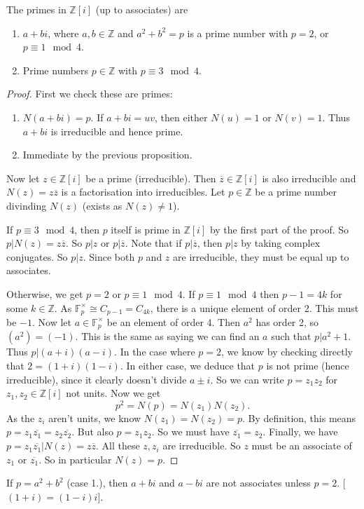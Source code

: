 \documentclass[egregdoesnotlikesansseriftitles,a4paper]{scrartcl}
\begin{document}
\begin{theorem}\label{gaussianprimes}
       The primes in $\mathbb{Z}[i]$ (up to associates) are
       \begin{enumerate}
             \item $a+bi$, where $a,b \in \mathbb{Z}$ and $a^2+b^2=p$ is a prime number with $p=2$, or $p \equiv 1 \mod 4$.
             \item Prime numbers $p \in \mathbb{Z}$ with $p \equiv 3 \mod 4$. 
       \end{enumerate}
       \begin{proof}
              First we check these are primes:
              \begin{enumerate}
                    \item $N (a+bi)=p$. If $a+bi =uv$, then either $N (u)=1$ or $N (v)=1$. Thus $a+bi$ is irreducible and hence prime.
                    \item Immediate by the previous proposition.
              \end{enumerate}
              Now let $z \in \mathbb{Z}[i]$ be a prime (irreducible). Then $\overline{z} \in \mathbb{Z}[i]$ is also irreducible and $N (z)=z \overline{z}$ is a factorisation into irreducibles. Let $p \in \mathbb{Z}$ be a prime number divinding $N (z)$ (exists as $N (z) \neq  1$). 

              If $p\equiv 3 \mod 4$, then $p$ itself is prime in $\mathbb{Z}[i]$ by the first part of the proof. So $p| N (z)=z \overline{z}$. So $p|z $ or $p|\overline{z}$. Note that if $p|\overline{z}$, then $p|z$ by taking complex conjugates. So $p|z$. Since both $p$ and $z$ are irreducible, they must be equal up to associates.

              Otherwise, we get $p=2$ or $p\equiv 1 \mod 4$. If $p\equiv 1 \mod 4$ then $p-1=4k$ for some $k \in \mathbb{Z}$. As $\mathbb{F}_{p}^{\times}\cong C_{p-1} =C_{4k}$, there is a unique element of order 2. This must be $-1$. Now let $a \in \mathbb{F}_{p}^{\times}$ be an element of order 4. Then $a^2$ has order 2, so $(a^2)=(-1)$. This is the same as saying we can find an $a$ such that $p| a^2+1$. Thus $p| (a+i)(a-i)$. In the case where $p=2$, we know by checking directly that $2=(1+i)(1-i)$. In either case, we deduce that $p$ is not prime (hence irreducible), since it clearly doesn't divide $a \pm i$. So we can write $p=z_1 z_2 $ for $z_1 ,z_2 \in \mathbb{Z}[i]$ not units. Now we get \[
              p^2=N (p)=N (z_1 )N (z_2 )
              .\] As the $z_i$ aren't units, we know $N (z_1 )=N (z_2 )=p$. By definition, this means $p=z_1 \overline{z_1}=z_2 \overline{z_2}$. But also $p=z_1 z_2 $. So we must have $\overline{z_1}=z_2 $. Finally, we have $p=z_1 \overline{z_1}| N (z)=z \overline{z}$. All these $z, z_i$ are irreducible. So $z$ must be an associate of $z_1 $ or $\overline{z_1}$. So in particular $N (z)=p$.
       \end{proof}
       \begin{remark}
              If $p=a^2+b^2$ (case 1.), then $a+bi$ and $a-bi $ are not associates unless $p=2$. [$(1+i)=(1-i)i$].
       \end{remark}
\end{theorem}
\end{document}
